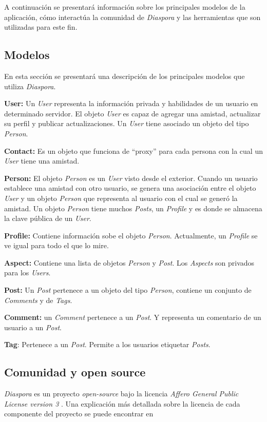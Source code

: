 A continuación se presentará información sobre los principales modelos de la aplicación, cómo interactúa la comunidad de \emph{Diaspora} y las herramientas que son utilizadas para este fin.

\subsection{Modelos}
En esta sección se presentará una descripción de los principales modelos que utiliza \emph{Diaspora}.

\textbf{User:} Un \emph{User} representa la información privada y habilidades de un usuario en determinado servidor. El objeto \emph{User} es capaz de agregar una amistad, actualizar su perfil y publicar actualizaciones. Un \emph{User} tiene asociado un objeto del tipo \emph{Person}. 

\textbf{Contact:} Es un objeto que funciona de ``proxy'' para cada persona con la cual un \emph{User} tiene una amistad.

\textbf{Person:} El objeto \emph{Person} es un \emph{User} visto desde el exterior. Cuando un usuario establece una amistad con otro usuario, se genera una asociación entre el objeto \emph{User} y un objeto \emph{Person} que representa al usuario con el cual se generó la amistad.
 Un objeto \emph{Person} tiene muchos \emph{Posts}, un \emph{Profile} y es donde se almacena la clave pública de un \emph{User}.

\textbf{Profile:} Contiene información sobe el objeto \emph{Person}. Actualmente, un \emph{Profile} se ve igual para todo el que lo mire.

\textbf{Aspect:} Contiene una lista de objetos \emph{Person} y \emph{Post}. Los \emph{Aspects} son privados para los \emph{Users}. 

\textbf{Post:} Un \emph{Post} pertenece a un objeto del tipo \emph{Person}, contiene un conjunto de \emph{Comments} y de \emph{Tags}.

\textbf{Comment:} un \emph{Comment} pertenece a un \emph{Post}. Y representa un comentario de un usuario a un \emph{Post}.

\textbf{Tag}: Pertenece a un \emph{Post}. Permite a los usuarios etiquetar \emph{Posts}.

\subsection{Comunidad y open source}

\emph{Diaspora} es un proyecto \emph{open-source} bajo la licencia \emph{Affero General Public License version 3} \cite{agpl}. Una explicación más detallada sobre la licencia de cada componente del proyecto se puede encontrar en \cite{copyright}

